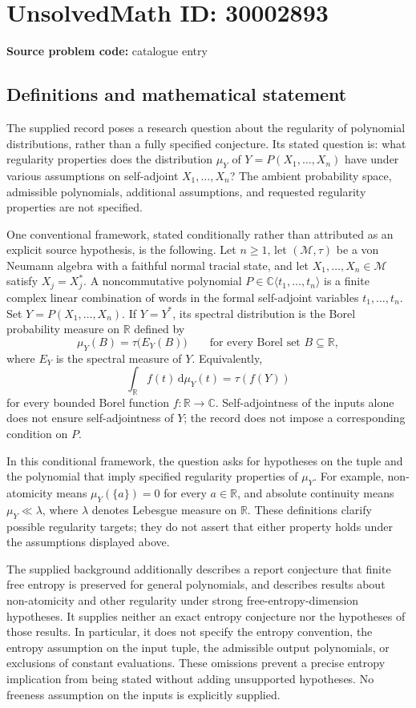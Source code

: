 \documentclass[11pt]{article}
\newcommand{\R}{\mathbb{R}}
\newcommand{\C}{\mathbb{C}}
\begin{document}
\section*{UnsolvedMath ID: 30002893}
\textbf{Source problem code:} catalogue entry
\subsection{Definitions and mathematical statement}
The supplied record poses a research question about the regularity of polynomial distributions, rather than a fully specified conjecture. Its stated question is: what regularity properties does the distribution \(\mu_Y\) of \(Y=P(X_1,\ldots,X_n)\) have under various assumptions on self-adjoint \(X_1,\ldots,X_n\)? The ambient probability space, admissible polynomials, additional assumptions, and requested regularity properties are not specified.

One conventional framework, stated conditionally rather than attributed as an explicit source hypothesis, is the following. Let \(n\geq 1\), let \((\mathcal M,\tau)\) be a von Neumann algebra with a faithful normal tracial state, and let \(X_1,\ldots,X_n\in\mathcal M\) satisfy \(X_j=X_j^*\). A noncommutative polynomial \(P\in\C\langle t_1,\ldots,t_n\rangle\) is a finite complex linear combination of words in the formal self-adjoint variables \(t_1,\ldots,t_n\). Set \(Y=P(X_1,\ldots,X_n)\). If \(Y=Y^*\), its spectral distribution is the Borel probability measure on \(\R\) defined by
\[
\mu_Y(B)=\tau\bigl(E_Y(B)\bigr)\qquad\text{for every Borel set }B\subseteq\R,
\]
where \(E_Y\) is the spectral measure of \(Y\). Equivalently,
\[
\int_{\R}f(t)\,\mathrm d\mu_Y(t)=\tau(f(Y))
\]
for every bounded Borel function \(f:\R\to\C\). Self-adjointness of the inputs alone does not ensure self-adjointness of \(Y\); the record does not impose a corresponding condition on \(P\).

In this conditional framework, the question asks for hypotheses on the tuple and the polynomial that imply specified regularity properties of \(\mu_Y\). For example, non-atomicity means \(\mu_Y(\{a\})=0\) for every \(a\in\R\), and absolute continuity means \(\mu_Y\ll\lambda\), where \(\lambda\) denotes Lebesgue measure on \(\R\). These definitions clarify possible regularity targets; they do not assert that either property holds under the assumptions displayed above.

The supplied background additionally describes a report conjecture that finite free entropy is preserved for general polynomials, and describes results about non-atomicity and other regularity under strong free-entropy-dimension hypotheses. It supplies neither an exact entropy conjecture nor the hypotheses of those results. In particular, it does not specify the entropy convention, the entropy assumption on the input tuple, the admissible output polynomials, or exclusions of constant evaluations. These omissions prevent a precise entropy implication from being stated without adding unsupported hypotheses. No freeness assumption on the inputs is explicitly supplied.
\end{document}
